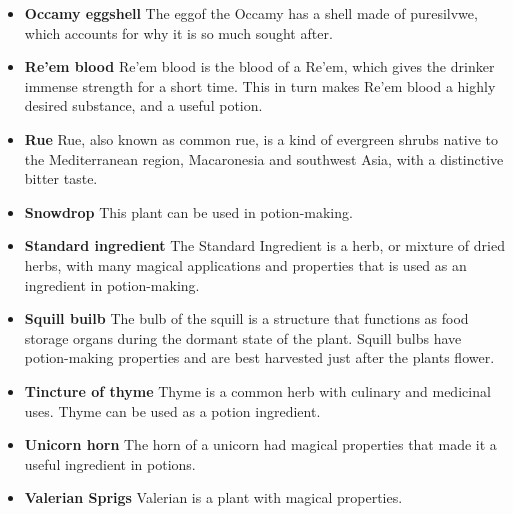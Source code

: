 \begin{itemize}
 \item \textbf {Occamy eggshell}
The eggof the Occamy has a shell made of puresilvwe, which accounts for why it is so much sought after.

 \item \textbf {Re'em blood}
Re'em blood is the blood of a Re'em, which gives the drinker immense strength for a short time. This in turn makes Re'em blood a highly desired substance, and a useful potion.

 \item \textbf {Rue}
Rue, also known as common rue, is a kind of evergreen shrubs native to the Mediterranean region, Macaronesia and southwest Asia, with a distinctive bitter taste.

 \item \textbf {Snowdrop}
This plant can be used in potion-making.

 \item \textbf {Standard ingredient}
The Standard Ingredient is a herb, or mixture of dried herbs, with many magical applications and properties that is used as an ingredient in potion-making. 

 \item \textbf {Squill builb}
The bulb of the squill is a structure that functions as food storage organs during the dormant state of the plant. Squill bulbs have potion-making properties and are best harvested just after the plants flower.

 \item \textbf {Tincture of thyme}
Thyme is a common herb with culinary and medicinal uses. Thyme can be used as a potion ingredient.

 \item \textbf {Unicorn horn}
The horn of a unicorn had magical properties that made it a useful ingredient in potions.

 \item \textbf {Valerian Sprigs}
 Valerian is a plant with magical properties.
 \end{itemize}
    \pagebreak
